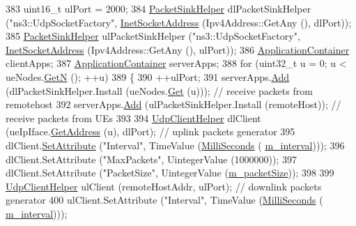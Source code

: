 \begin{DoxyCode}
383   uint16\_t ulPort = 2000;
384   \hyperlink{classns3_1_1PacketSinkHelper}{PacketSinkHelper} dlPacketSinkHelper (\textcolor{stringliteral}{"ns3::UdpSocketFactory"}, 
      \hyperlink{classns3_1_1InetSocketAddress}{InetSocketAddress} (Ipv4Address::GetAny (), dlPort));
385   \hyperlink{classns3_1_1PacketSinkHelper}{PacketSinkHelper} ulPacketSinkHelper (\textcolor{stringliteral}{"ns3::UdpSocketFactory"}, 
      \hyperlink{classns3_1_1InetSocketAddress}{InetSocketAddress} (Ipv4Address::GetAny (), ulPort));
386   \hyperlink{classns3_1_1ApplicationContainer}{ApplicationContainer} clientApps;
387   \hyperlink{classns3_1_1ApplicationContainer}{ApplicationContainer} serverApps;
388   \textcolor{keywordflow}{for} (uint32\_t u = 0; u < ueNodes.\hyperlink{classns3_1_1NodeContainer_aed647ac56d0407a7706aba02eb44b951}{GetN} (); ++u)
389     \{
390       ++ulPort;
391       serverApps.\hyperlink{classns3_1_1ApplicationContainer_ad09ab1a1ad5849d518d5f4c262e38152}{Add} (dlPacketSinkHelper.Install (ueNodes.\hyperlink{classns3_1_1NodeContainer_a9ed96e2ecc22e0f5a3d4842eb9bf90bf}{Get} (u))); \textcolor{comment}{// receive packets from
       remotehost}
392       serverApps.\hyperlink{classns3_1_1ApplicationContainer_ad09ab1a1ad5849d518d5f4c262e38152}{Add} (ulPacketSinkHelper.Install (remoteHost));  \textcolor{comment}{// receive packets from UEs}
393 
394       \hyperlink{classns3_1_1UdpClientHelper}{UdpClientHelper} dlClient (ueIpIface.\hyperlink{classns3_1_1Ipv4InterfaceContainer_ae63208dcd222be986822937ee4aa828c}{GetAddress} (u), dlPort); \textcolor{comment}{// uplink
       packets generator}
395       dlClient.\hyperlink{classns3_1_1UdpClientHelper_a8bbae16a28f85ab3f3b5aa4642edfeae}{SetAttribute} (\textcolor{stringliteral}{"Interval"}, TimeValue (\hyperlink{group__timecivil_gaf26127cf4571146b83a92ee18679c7a9}{MilliSeconds} (
      \hyperlink{classLenaTdTbfqFfMacSchedulerTestCase1_af206b10b2e44fe838cf21d600d98c263}{m\_interval})));
396       dlClient.SetAttribute (\textcolor{stringliteral}{"MaxPackets"}, UintegerValue (1000000));
397       dlClient.SetAttribute (\textcolor{stringliteral}{"PacketSize"}, UintegerValue (\hyperlink{classLenaTdTbfqFfMacSchedulerTestCase1_a73ee5588d1ae0c946488fbb0d3d4e71f}{m\_packetSize}));
398 
399       \hyperlink{classns3_1_1UdpClientHelper}{UdpClientHelper} ulClient (remoteHostAddr, ulPort);           \textcolor{comment}{// downlink packets
       generator}
400       ulClient.SetAttribute (\textcolor{stringliteral}{"Interval"}, TimeValue (\hyperlink{group__timecivil_gaf26127cf4571146b83a92ee18679c7a9}{MilliSeconds} (
      \hyperlink{classLenaTdTbfqFfMacSchedulerTestCase1_af206b10b2e44fe838cf21d600d98c263}{m\_interval})));

\end{DoxyCode}
